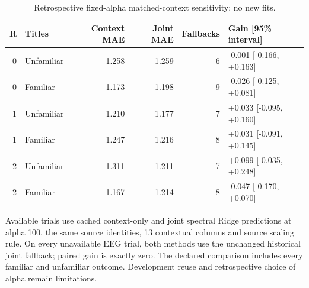 \documentclass[10pt,a4paper]{article}
\begin{document}
\begin{table}[tbp]
\centering
\small
\caption{Retrospective fixed-alpha matched-context sensitivity; no new fits.}
\label{tab:matched}
\begin{tabular}{rlrrrl}
\toprule
R & Titles & Context MAE & Joint MAE & Fallbacks & Gain [95\% interval] \\
\midrule
0 & Unfamiliar & 1.258 & 1.259 & 6 & -0.001 [-0.166, +0.163] \\
0 & Familiar & 1.173 & 1.198 & 9 & -0.026 [-0.125, +0.081] \\
1 & Unfamiliar & 1.210 & 1.177 & 7 & +0.033 [-0.095, +0.160] \\
1 & Familiar & 1.247 & 1.216 & 8 & +0.031 [-0.091, +0.145] \\
2 & Unfamiliar & 1.311 & 1.211 & 7 & +0.099 [-0.035, +0.248] \\
2 & Familiar & 1.167 & 1.214 & 8 & -0.047 [-0.170, +0.070] \\
\bottomrule
\end{tabular}
\par\medskip\begin{minipage}{0.97\linewidth}\footnotesize Available trials use cached context-only and joint spectral Ridge predictions at alpha 100, the same source identities, 13 contextual columns and source scaling rule. On every unavailable EEG trial, both methods use the unchanged historical joint fallback; paired gain is exactly zero. The declared comparison includes every familiar and unfamiliar outcome. Development reuse and retrospective choice of alpha remain limitations.\end{minipage}
\end{table}
\end{document}

